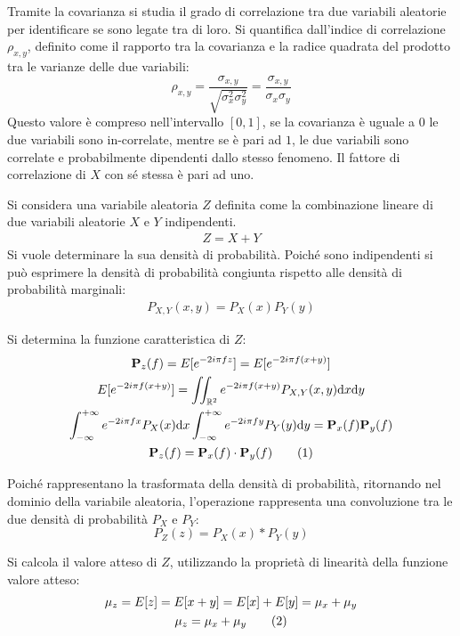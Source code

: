 \documentclass{article}
\newcommand{\df}{\mathrm{d}}
\newcommand{\tageq}{\tag{\stepcounter{equation}\theequation}}
\numberwithin{equation}{subsection}
\begin{document}
Tramite la covarianza si studia il grado di correlazione tra due variabili aleatorie per identificare se sono legate tra di loro. 
Si quantifica dall'indice di correlazione $\rho_{x,y}$, definito come il rapporto tra la covarianza e la radice quadrata del prodotto tra le varianze delle due variabili:
\begin{equation}
    \rho_{x,y}=\displaystyle\frac{\sigma_{x,y}}{\sqrt{\sigma_x^2\sigma_y^2}}=\frac{\sigma_{x,y}}{\sigma_x\sigma_y}
\end{equation}
Questo valore è compreso nell'intervallo $[0,1]$, se la covarianza è uguale a $0$ le due variabili sono in-correlate, mentre se è pari ad $1$, le due variabili sono 
correlate e probabilmente dipendenti dallo stesso fenomeno. Il fattore di correlazione di $X$ con sé stessa è pari ad uno. 



Si considera una variabile aleatoria $Z$ definita come la combinazione lineare di due variabili aleatorie $X$ e $Y$ indipendenti. 
\begin{gather*}
    Z=X+Y
\end{gather*}
Si vuole determinare la sua densità di probabilità. 
Poiché sono indipendenti si può esprimere la densità di probabilità congiunta rispetto alle densità di probabilità marginali:
\begin{gather*}
    P_{X,Y}(x,y)=P_X(x)P_Y(y)
\end{gather*}

Si determina la funzione caratteristica di $Z$:
\begin{gather*}
    \mathbf{P}_z(f)=E[e^{-2i\pi fz}]=E[e^{-2i\pi f(x+y)}]\\
    E[e^{-2i\pi f(x+y)}]\displaystyle=\iint_{\mathbb{R}^2}e^{-2i\pi f(x+y)}P_{X,Y}(x,y)\df x\df y\\
    \displaystyle\int_{-\infty}^{+\infty}e^{-2i\pi fx}P_X(x)\df x\int_{-\infty}^{+\infty}e^{-2i\pi fy}P_Y(y)\df y=\mathbf{P}_x(f)\mathbf{P}_y(f)\\
    \mathbf{P}_z(f)=\mathbf{P}_x(f)\cdot\mathbf{P}_y(f)\tageq
\end{gather*}

Poiché rappresentano la trasformata della densità di probabilità, ritornando nel dominio della variabile aleatoria, l'operazione rappresenta una convoluzione 
tra le due densità di probabilità $P_X$ e $P_Y$:
\begin{equation}
    P_Z(z)=P_X(x)*P_Y(y)
\end{equation}


Si calcola il valore atteso di $Z$, utilizzando la proprietà di linearità della funzione valore atteso:
\begin{gather*}
    \mu_z=E[z]=E[x+y]=E[x]+E[y]=\mu_x+\mu_y\\
    \mu_z=\mu_x+\mu_y\tageq
\end{gather*}
\end{document}
